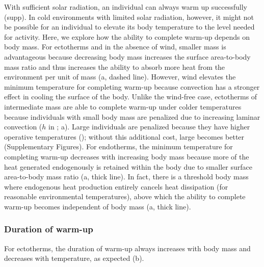 With sufficient solar radiation, an individual can always warm up successfully (supp). %
In cold environments with limited solar radiation, however, it might not be possible for an individual to elevate its body temperature to the level needed for activity.
Here, we explore how the ability to complete warm-up depends on body mass.
For ectotherms and in the absence of wind, smaller mass is advantageous because decreasing body mass increases the surface area-to-body mass ratio and thus increases the ability to absorb more heat from the environment per unit of mass (a, dashed line).
However, wind elevates the minimum temperature for completing warm-up because convection has a stronger effect in cooling the surface of the body.
Unlike the wind-free case, ectotherms of intermediate mass are able to complete warm-up under colder temperatures because individuals with small body mass are penalized due to increasing laminar convection ($h$ in ; a).
Large individuals are penalized because they have higher operative temperatures (); without this additional cost, large becomes better (Supplementary Figures).
For endotherms, the minimum temperature for completing warm-up decreases with increasing body mass because more of the heat generated endogenously is retained within the body due to smaller surface area-to-body mass ratio (a, thick line).
In fact, there is a threshold body mass where endogenous heat production entirely cancels heat dissipation (for reasonable environmental temperatures), above which the ability to complete warm-up becomes independent of body mass (a, thick line).

\subsubsection*{Duration of warm-up}

For ectotherms, the duration of warm-up always increases with body mass and decreases with temperature, as expected (b).

